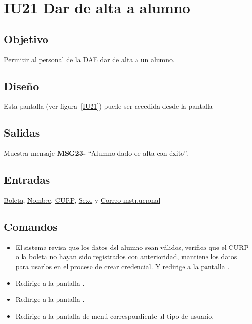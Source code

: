 
\section{IU21 Dar de alta a alumno}

\subsection{Objetivo}
	Permitir al personal de la DAE dar de alta a un alumno.
\subsection{Diseño}
    Esta pantalla  (ver figura~\ref{IU21}) puede ser accedida desde la pantalla 


\subsection{Salidas}
Muestra mensaje {\bf MSG23-} ``Alumno dado de alta con éxito''.
\subsection{Entradas}
    \hyperlink{Alumno.Boleta}{Boleta}, \hyperlink{Alumno.Nombre}{Nombre}, \hyperlink{Alumno.CURP}{CURP}, \hyperlink{Alumno.Sexo}{Sexo} y \hyperlink{Alumno.Correo institucional}{Correo institucional}
\subsection{Comandos}
\begin{itemize}
\item {}  El sistema revisa que los datos del alumno sean válidos, verifica que el CURP o la boleta no hayan sido registrados con anterioridad, mantiene los datos para usarlos en el proceso de crear credencial. Y redirige a la pantalla .
    \item {} Redirige a la pantalla .
    \item {} Redirige a la pantalla .
    \item {} Redirige a la pantalla de menú correspondiente al tipo de usuario.
    
\end{itemize}

